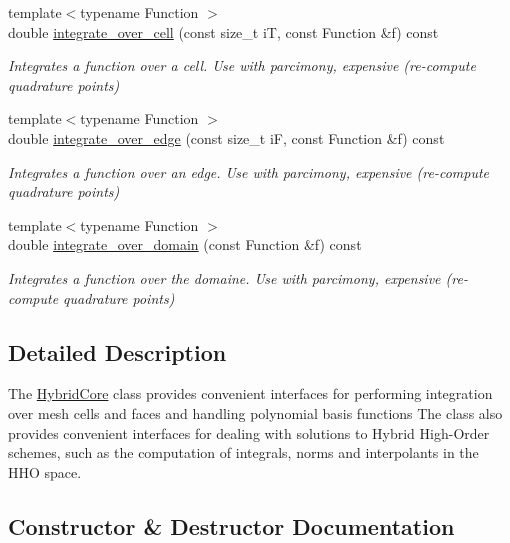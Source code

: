 \begin{DoxyCompactItemize}
{\footnotesize template$<$typename Function $>$ }\\double \hyperlink{group__HybridCore_ga64ffbc44306e06018efe3cea5a62f652}{integrate\+\_\+over\+\_\+cell} (const size\+\_\+t iT, const Function \&f) const
\begin{DoxyCompactList}\small\item\em Integrates a function over a cell. Use with parcimony, expensive (re-\/compute quadrature points) \end{DoxyCompactList}\item 
{\footnotesize template$<$typename Function $>$ }\\double \hyperlink{group__HybridCore_ga03f276ea9c905d64662c39b7555d560c}{integrate\+\_\+over\+\_\+edge} (const size\+\_\+t iF, const Function \&f) const
\begin{DoxyCompactList}\small\item\em Integrates a function over an edge. Use with parcimony, expensive (re-\/compute quadrature points) \end{DoxyCompactList}\item 
{\footnotesize template$<$typename Function $>$ }\\double \hyperlink{group__HybridCore_gab058c4e54d1e33c49e537b8d0f602848}{integrate\+\_\+over\+\_\+domain} (const Function \&f) const
\begin{DoxyCompactList}\small\item\em Integrates a function over the domaine. Use with parcimony, expensive (re-\/compute quadrature points) \end{DoxyCompactList}\end{DoxyCompactItemize}


\subsection{Detailed Description}
The \hyperlink{classHArDCore2D_1_1HybridCore}{Hybrid\+Core} class provides convenient interfaces for performing integration over mesh cells and faces and handling polynomial basis functions The class also provides convenient interfaces for dealing with solutions to Hybrid High-\/\+Order schemes, such as the computation of integrals, norms and interpolants in the H\+HO space. 

\subsection{Constructor \& Destructor Documentation}
\mbox{\label{classHArDCore2D_1_1HybridCore_ae189b44b4574688e4ae5c59d853317ab}} 
